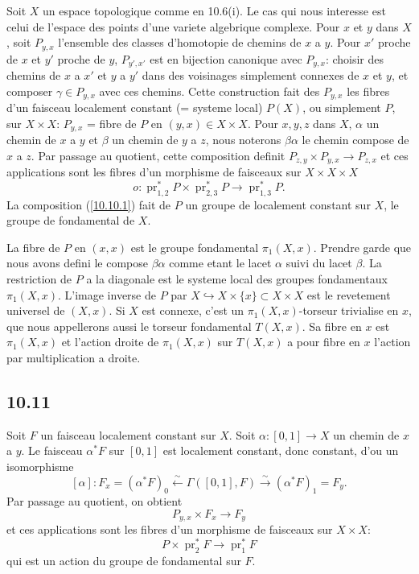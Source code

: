 \documentclass[12pt,a4paper]{article}
\theoremstyle{plain}
\theoremstyle{definition}
\theoremstyle{remark}
\DeclareMathOperator{\pr}{pr}
\begin{document}
Soit $X$ un espace topologique comme en 10.6(i). Le cas qui nous interesse est celui de l'espace des points d'une variete algebrique complexe. Pour $x$ et $y$ dans $X$, soit $P_{y,x}$ l'ensemble des classes d'homotopie de chemins de $x$ a $y$. Pour $x'$ proche de $x$ et $y'$ proche de $y$, $P_{y',x'}$ est en bijection canonique avec $P_{y,x}$: choisir des chemins de $x$ a $x'$ et $y$ a $y'$ dans des voisinages simplement connexes de $x$ et $y$, et composer $\gamma \in P_{y,x}$ avec ces chemins. Cette construction fait des $P_{y,x}$ les fibres d'un faisceau localement constant (= systeme local) $P(X)$, ou simplement $P$, sur $X \times X$: $P_{y,x}$ = fibre de $P$ en $(y,x) \in X \times X$. Pour $x, y, z$ dans $X$, $\alpha$ un chemin de $x$ a $y$ et $\beta$ un chemin de $y$ a $z$, nous noterons $\beta\alpha$ le chemin compose de $x$ a $z$. Par passage au quotient, cette composition definit $P_{z,y} \times P_{y,x} \to P_{z,x}$ et ces applications sont les fibres d'un morphisme de faisceaux sur $X \times X \times X$
\begin{equation}\label{10.10.1}
o: \pr_{1,2}^* P \times \pr_{2,3}^* P \longrightarrow \pr_{1,3}^* P. \tag{10.10.1}
\end{equation}
La composition (\ref{10.10.1}) fait de $P$ un groupe de localement constant sur $X$, le groupe de fondamental de $X$.

La fibre de $P$ en $(x,x)$ est le groupe fondamental $\pi_1(X,x)$. Prendre garde que nous avons defini le compose $\beta\alpha$ comme etant le lacet $\alpha$ suivi du lacet $\beta$. La restriction de $P$ a la diagonale est le systeme local des groupes fondamentaux $\pi_1(X,x)$. L'image inverse de $P$ par $X \hookrightarrow X \times \{x\} \subset X \times X$ est le revetement universel de $(X,x)$. Si $X$ est connexe, c'est un $\pi_1(X,x)$-torseur trivialise en $x$, que nous appellerons aussi le torseur fondamental $T(X,x)$. Sa fibre en $x$ est $\pi_1(X,x)$ et l'action droite de $\pi_1(X,x)$ sur $T(X,x)$ a pour fibre en $x$ l'action par multiplication a droite.

\subsection*{10.11}

Soit $F$ un faisceau localement constant sur $X$. Soit $\alpha: [0,1] \to X$ un chemin de $x$ a $y$. Le faisceau $\alpha^* F$ sur $[0,1]$ est localement constant, donc constant, d'ou un isomorphisme
$$[\alpha]: F_x = (\alpha^* F)_0 \xleftarrow{\sim} \Gamma([0,1], F) \xrightarrow{\sim} (\alpha^* F)_1 = F_y.$$
Par passage au quotient, on obtient
$$P_{y,x} \times F_x \longrightarrow F_y$$
et ces applications sont les fibres d'un morphisme de faisceaux sur $X \times X$:
\begin{equation}\label{10.11.1}
P \times \pr_2^* F \longrightarrow \pr_1^* F \tag{10.11.1}
\end{equation}
qui est un action du groupe de fondamental sur $F$.
\end{document}
